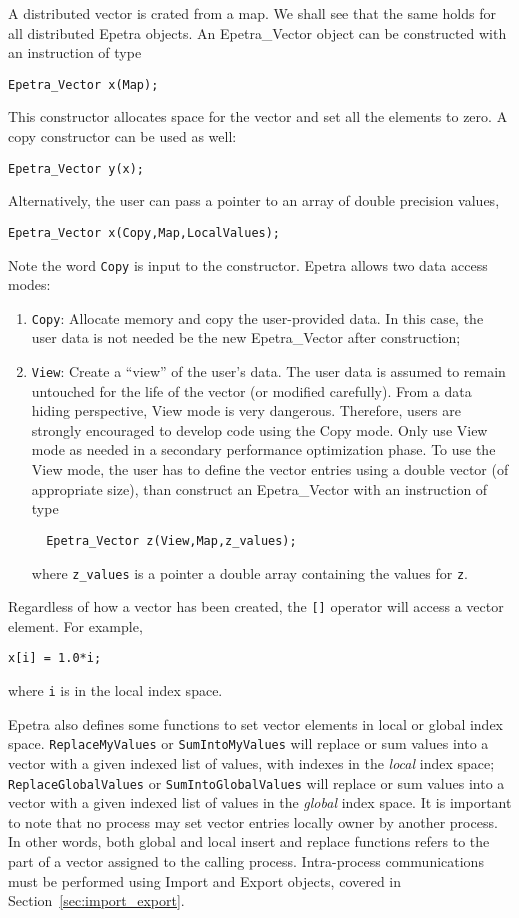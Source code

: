 A distributed vector is crated from a map. We shall see that the same
holds for all distributed Epetra objects. An Epetra\_Vector object can
be constructed with an instruction of type
\begin{verbatim}
Epetra_Vector x(Map);
\end{verbatim}
This constructor allocates space for the vector and set all the elements
to zero. A copy constructor can be used as well:
\begin{verbatim}
Epetra_Vector y(x);
\end{verbatim}
Alternatively, the user can pass a pointer to an array of double
precision values,
\begin{verbatim}
Epetra_Vector x(Copy,Map,LocalValues);
\end{verbatim}
Note the word \verb!Copy! is input to the constructor. Epetra allows two
data access modes:
\begin{enumerate}
\item \verb!Copy!: Allocate memory and copy the user-provided data. In
  this case, the user data is not needed be the new Epetra\_Vector after
  construction;
\item \verb!View!: Create a ``view'' of the user's data. The user data
  is assumed to remain untouched for the life of the vector (or modified
  carefully). From a data hiding perspective, View mode is very
  dangerous. Therefore, users are strongly encouraged to develop code
  using the Copy mode. Only use View mode as needed in a secondary
  performance optimization phase. To use the View mode, the user has to
  define the vector entries using a double vector (of appropriate size),
  than construct an Epetra\_Vector with an instruction of type
\begin{verbatim}
  Epetra_Vector z(View,Map,z_values);
\end{verbatim}
  where \verb!z_values! is a pointer a double array containing the
  values for \verb!z!.
\end{enumerate}

Regardless of how a vector has been created, the \verb![]!  operator will
access a vector element. For example,
\begin{verbatim}
x[i] = 1.0*i;
\end{verbatim}
where \verb!i! is in the local index space. 

Epetra also defines some functions to set vector elements in local or
global index space.  \verb!ReplaceMyValues! or \verb!SumIntoMyValues!
will replace or sum values into a vector with a given indexed list of
values, with indexes in the {\em local} index space;
\verb!ReplaceGlobalValues! or \verb!SumIntoGlobalValues! will replace or
sum values into a vector with a given indexed list of values in the {\em
  global} index space. It is important to note that no process may set
vector entries locally owner by another process. In other words, both
global and local insert and replace functions refers to the part of a
vector assigned to the calling process. Intra-process communications
must be performed using Import and Export objects, covered in
Section~\ref{sec:import_export}.


